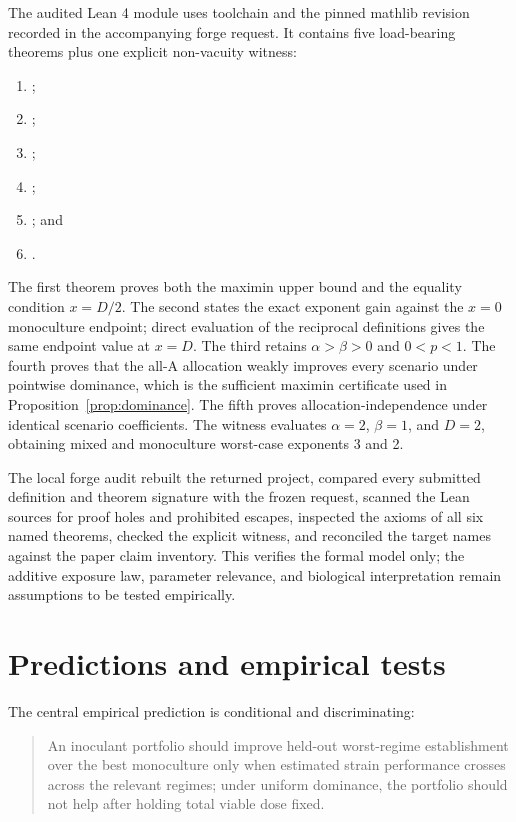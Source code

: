 \documentclass[10pt,twocolumn]{article}
\begin{document}
The audited Lean 4 module  uses toolchain
 and the pinned mathlib revision recorded in the
accompanying forge request. It contains five load-bearing theorems plus one
explicit non-vacuity witness:
\begin{enumerate}
\item {};
\item {};
\item {};
\item {};
\item {}; and
\item {}.
\end{enumerate}
The first theorem proves both the maximin upper bound and the equality
condition $x=D/2$. The second states the exact exponent gain against the
$x=0$ monoculture endpoint; direct evaluation of the reciprocal definitions
gives the same endpoint value at $x=D$. The third retains
$\alpha>\beta>0$ and $0<p<1$. The fourth proves that the all-A allocation
weakly improves every scenario under pointwise dominance, which is the
sufficient maximin certificate used in Proposition~\ref{prop:dominance}. The
fifth proves allocation-independence under identical scenario coefficients.
The witness evaluates $\alpha=2$, $\beta=1$, and $D=2$, obtaining mixed and
monoculture worst-case exponents 3 and 2.

The local forge audit rebuilt the returned project, compared every submitted
definition and theorem signature with the frozen request, scanned the Lean
sources for proof holes and prohibited escapes, inspected the axioms of all
six named theorems, checked the explicit witness, and reconciled the target
names against the paper claim inventory. This verifies the formal model only;
the additive exposure law, parameter relevance, and biological interpretation
remain assumptions to be tested empirically.

\section{Predictions and empirical tests}

The central empirical prediction is conditional and discriminating:

\begin{quote}
An inoculant portfolio should improve held-out worst-regime establishment over
the best monoculture only when estimated strain performance crosses across the
relevant regimes; under uniform dominance, the portfolio should not help after
holding total viable dose fixed.
\end{quote}
\end{document}
